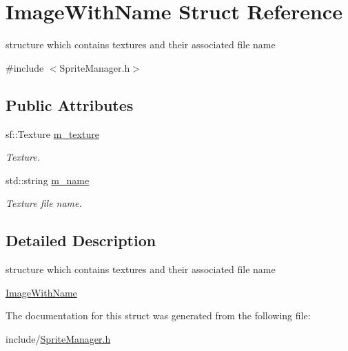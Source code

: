 \hypertarget{struct_image_with_name}{\section{Image\+With\+Name Struct Reference}
\label{struct_image_with_name}
}


structure which contains textures and their associated file name  




{\ttfamily \#include $<$Sprite\+Manager.\+h$>$}

\subsection*{Public Attributes}
\begin{DoxyCompactItemize}
\item 
\hypertarget{struct_image_with_name_a31c52b6a208c5dc8440031c4f76afa63}{sf\+::\+Texture \hyperlink{struct_image_with_name_a31c52b6a208c5dc8440031c4f76afa63}{m\+\_\+texture}}\label{struct_image_with_name_a31c52b6a208c5dc8440031c4f76afa63}

\begin{DoxyCompactList}\small\item\em Texture. \end{DoxyCompactList}\item 
\hypertarget{struct_image_with_name_ae911332d5a2772f20e49f3d5d670b966}{std\+::string \hyperlink{struct_image_with_name_ae911332d5a2772f20e49f3d5d670b966}{m\+\_\+name}}\label{struct_image_with_name_ae911332d5a2772f20e49f3d5d670b966}

\begin{DoxyCompactList}\small\item\em Texture file name. \end{DoxyCompactList}\end{DoxyCompactItemize}


\subsection{Detailed Description}
structure which contains textures and their associated file name 

\hyperlink{struct_image_with_name}{Image\+With\+Name} 

The documentation for this struct was generated from the following file\+:\begin{DoxyCompactItemize}
\item 
include/\hyperlink{_sprite_manager_8h}{Sprite\+Manager.\+h}\end{DoxyCompactItemize}
